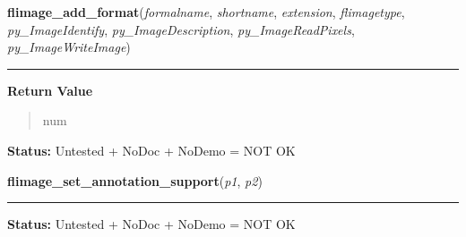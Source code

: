 \hspace{.8\funcindent}\begin{boxedminipage}{\funcwidth}

    \raggedright \textbf{flimage\_add\_format}(\textit{formalname}, \textit{shortname}, \textit{extension}, \textit{flimagetype}, \textit{py\_ImageIdentify}, \textit{py\_ImageDescription}, \textit{py\_ImageReadPixels}, \textit{py\_ImageWriteImage})

    \vspace{-1.5ex}

    \rule{\textwidth}{0.5\fboxrule}
\setlength{\parskip}{2ex}
\setlength{\parskip}{1ex}
      \textbf{Return Value}
    \vspace{-1ex}

      \begin{quote}
      num

      \end{quote}

\textbf{Status:} Untested + NoDoc + NoDemo = NOT OK



    \end{boxedminipage}

    \label{xformslib:flflimage:flimage_set_annotation_support}

    \vspace{0.5ex}

\hspace{.8\funcindent}\begin{boxedminipage}{\funcwidth}

    \raggedright \textbf{flimage\_set\_annotation\_support}(\textit{p1}, \textit{p2})

    \vspace{-1.5ex}

    \rule{\textwidth}{0.5\fboxrule}
\setlength{\parskip}{2ex}
\setlength{\parskip}{1ex}
\textbf{Status:} Untested + NoDoc + NoDemo = NOT OK



    \end{boxedminipage}

    \label{xformslib:flflimage:flimage_getcolormap}

    \vspace{0.5ex}


